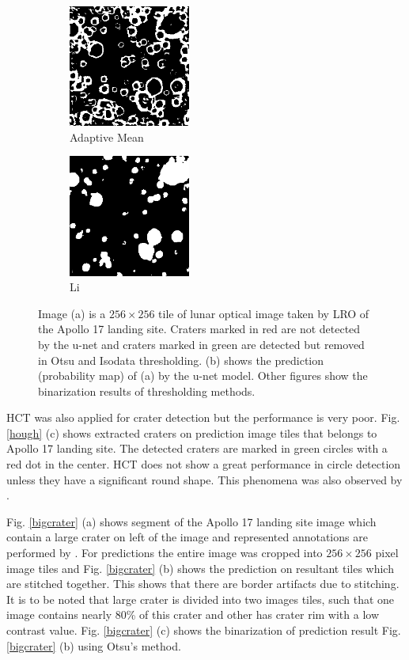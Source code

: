 \documentclass[11pt]{article}
\begin{document}
\begin{figure}[H]
\begin{subfigure}{5cm}
		\centering
		\includegraphics[width=4cm]{files/results/adaptiveMean_mean.png}
		\caption{Adaptive Mean}\hfill
	\end{subfigure}
	\begin{subfigure}[b]{1.0\textwidth}
		\centering
		\includegraphics[width=4cm]{files/results/li.png}
		\caption{Li}\hfill
	\end{subfigure}
\caption{Image (a) is a $256 \times 256$ tile of lunar optical image taken by LRO of the Apollo 17 landing site. Craters marked in red are not detected by the u-net and craters marked in green are detected but removed in Otsu and Isodata thresholding.  (b) shows the prediction (probability map) of (a) by the u-net model. Other figures show the binarization results of thresholding methods.}
\label{thresholding}	
\end{figure}

HCT was also applied for crater detection but the performance is very poor. Fig. \ref{hough} (c) shows extracted craters on prediction image tiles that belongs to Apollo 17 landing site. The detected craters are marked in green circles with a red dot in the center. HCT does not show a great performance in circle detection unless they have a significant round shape. This phenomena was also observed by \cite{wetzler2005learning}.

Fig. \ref{bigcrater} (a) shows segment of the Apollo 17 landing site image which contain a large crater on left of the image and represented annotations are performed by \cite{dino2020}. For predictions the entire image was cropped into $256\times256$ pixel image tiles and Fig. \ref{bigcrater} (b) shows the prediction on resultant tiles which are stitched together. This shows that there are border artifacts due to stitching. It is to be noted that large crater is divided into two images tiles, such that one image contains nearly 80\% of this crater and other has crater rim with a low contrast value. Fig. \ref{bigcrater} (c) shows the binarization of prediction result Fig. \ref{bigcrater} (b) using Otsu's method.
\end{document}
